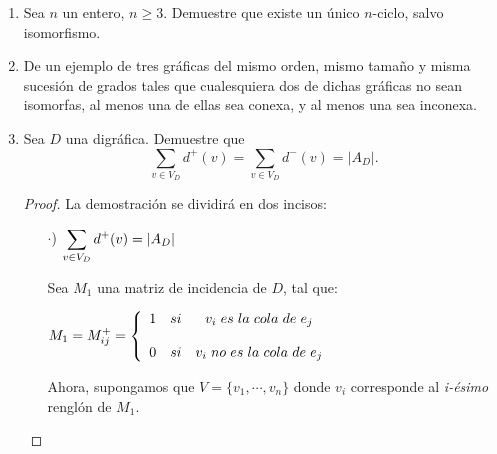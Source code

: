 \documentclass{article}
\begin{document}
\begin{enumerate}
  \item Sea $n$ un entero, $n \ge 3$.   Demuestre que existe un \'unico
    $n$-ciclo, salvo isomorfismo.
  \item De un ejemplo de tres gr\'aficas del mismo orden, mismo tama\~no y misma
    sucesi\'on de grados tales que cualesquiera dos de dichas gr\'aficas no sean
    isomorfas, al menos una de ellas sea conexa, y al menos una sea inconexa.
  \item Sea $D$ una digr\'afica.   Demuestre que
    $$\sum_{v \in V_D} d^+(v) = \sum_{v \in V_D} d^-(v) = |A_D|.$$
    
    \renewcommand\qedsymbol{QED}
    \begin{proof}
    La demostración se dividirá en dos incisos:  
    \begin{itemize}
    \item[$\cdot$)] $\displaystyle \sum_{v \in V_{D}} d^{+}(v) = \abs{A_{D}}$ 
      
      Sea $M_{1}$ una matriz de incidencia de $D$, tal que:
      \begin{center}
        $M_{1} = M^{+}_{ij}
        = \left \{ 
        \begin{array}{lcc}
          1 &   si  & v_{i} \hspace{0.3em} es \hspace{0.3em} la
          \hspace{0.3em} cola \hspace{0.3em} de \hspace{0.3em} e_{j} \\
          \\0 &  si & v_{i} \hspace{0.3em} no \hspace{0.3em} es \hspace{0.3em}
          la \hspace{0.3em} cola \hspace{0.3em} de \hspace{0.3em} e_{j}
        \end{array}
        \right.$
      \end{center}
      Ahora, supongamos que $V = \{v_{1}, \dotsm, v_{n}\}$ donde $v_{i}$
      corresponde al \textit{i-ésimo} renglón de $M_{1}$.
      

\end{itemize}
\end{proof}
\end{enumerate}
\end{document}
